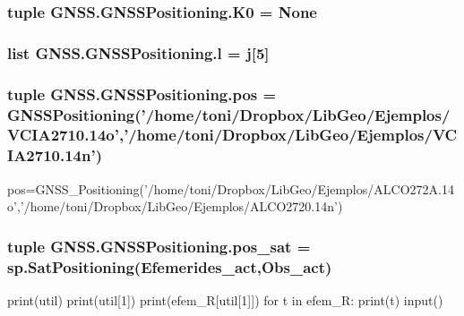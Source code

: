 \subsubsection[{K0}]{\setlength{\rightskip}{0pt plus 5cm}tuple G\-N\-S\-S.\-G\-N\-S\-S\-Positioning.\-K0 = None}\label{namespaceGNSS_1_1GNSSPositioning_a3e75da208a1ed4b340731d72bfc31dfe}
\subsubsection[{l}]{\setlength{\rightskip}{0pt plus 5cm}list G\-N\-S\-S.\-G\-N\-S\-S\-Positioning.\-l = j[5]}\label{namespaceGNSS_1_1GNSSPositioning_ab674e333d92cbfb7ad8d6e5b04fac27a}
\subsubsection[{pos}]{\setlength{\rightskip}{0pt plus 5cm}tuple G\-N\-S\-S.\-G\-N\-S\-S\-Positioning.\-pos = {\bf G\-N\-S\-S\-Positioning}('/home/toni/Dropbox/Lib\-Geo/Ejemplos/V\-C\-I\-A2710.\-14o','/home/toni/Dropbox/Lib\-Geo/Ejemplos/V\-C\-I\-A2710.\-14n')}\label{namespaceGNSS_1_1GNSSPositioning_a895f7a0c44fc72cc0eaaef62907d83b9}


pos=G\-N\-S\-S\-\_\-\-Positioning('/home/toni/\-Dropbox/\-Lib\-Geo/\-Ejemplos/\-A\-L\-C\-O272\-A.14o','/home/toni/\-Dropbox/\-Lib\-Geo/\-Ejemplos/\-A\-L\-C\-O2720.14n') 

\subsubsection[{pos\-\_\-sat}]{\setlength{\rightskip}{0pt plus 5cm}tuple G\-N\-S\-S.\-G\-N\-S\-S\-Positioning.\-pos\-\_\-sat = sp.\-Sat\-Positioning({\bf Efemerides\-\_\-act},Obs\-\_\-act)}\label{namespaceGNSS_1_1GNSSPositioning_a0f13e3aa7849ca4b639f08fa3715db69}


print(util) print(util[1]) print(efem\-\_\-\-R[util[1]]) for t in efem\-\_\-\-R\-: print(t) input() 

